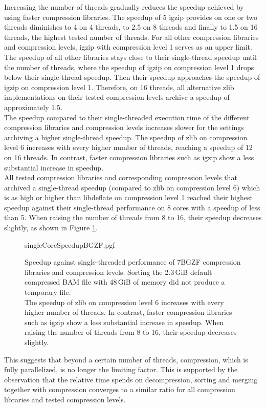 Increasing the number of threads gradually reduces the speedup achieved by using faster compression libraries. The speedup of 5 igzip provides on one or two threads diminishes to 4 on 4 threads, to 2.5 on 8 threads and finally to 1.5 on 16 threads, the highest tested number of threads. For all other compression libraries and compression levels, igzip with compression level 1 serves as an upper limit. The speedup of all other libraries stays close to their single-thread speedup until the number of threads, where the speedup of igzip on compression level 1 drops below their single-thread speedup. Then their speedup approaches the speedup of igzip on compression level 1. Therefore, on 16 threads, all alternative zlib implementations on their tested compression levels archive a speedup of approximately 1.5. \\
The speedup compared to their single-threaded execution time of the different compression libraries and compression levels increases slower for the settings archiving a higher single-thread speedup. The speedup of zlib on compression level 6 increases with every higher number of threads, reaching a speedup of 12 on 16 threads. In contrast, faster compression libraries such as igzip show a less substantial increase in speedup. \\
All tested compression libraries and corresponding compression levels that archived a single-thread speedup (compared to zlib on compression level 6) which is as high or higher than libdeflate on compression level 1 reached their highest speedup against their single-thread performance on 8 cores with a speedup of less than 5. When raising the number of threads from 8 to 16, their speedup decreases slightly, as shown in Figure \ref{fig:bgzfSngleCoreSpeedup}. \\
\begin{figure}[!htb]
        {singleCoreSpeedupBGZF.pgf}
    \caption{Speedup against single-threaded performance of 7BGZF compression libraries and compression levels. Sorting the 2.3\,GiB default compressed BAM file with 48\,GiB of memory did not produce a temporary file. \\
    The speedup of zlib on compression level 6 increases with every higher number of threads. In contrast, faster compression libraries such as igzip show a less substantial increase in speedup. When raising the number of threads from 8 to 16, their speedup decreases slightly.}
    \label{fig:bgzfSngleCoreSpeedup}
\end{figure}
This suggests that beyond a certain number of threads, compression, which is fully parallelized, is no longer the limiting factor. This is supported by the observation that the relative time \sort spends on decompression, sorting and merging together with compression converges to a similar ratio for all compression libraries and tested compression levels. \\
